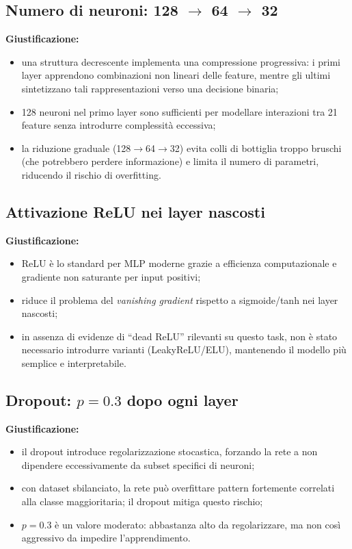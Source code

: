 \subsection{Numero di neuroni: 128 $\rightarrow$ 64 $\rightarrow$ 32}
\textbf{Giustificazione:}
\begin{itemize}
  \item una struttura decrescente implementa una compressione progressiva: i primi layer apprendono combinazioni non lineari delle feature, mentre gli ultimi sintetizzano tali rappresentazioni verso una decisione binaria;
  \item 128 neuroni nel primo layer sono sufficienti per modellare interazioni tra 21 feature senza introdurre complessità eccessiva;
  \item la riduzione graduale (128$\to$64$\to$32) evita colli di bottiglia troppo bruschi (che potrebbero perdere informazione) e limita il numero di parametri, riducendo il rischio di overfitting.
\end{itemize}

\subsection{Attivazione ReLU nei layer nascosti}
\textbf{Giustificazione:}
\begin{itemize}
  \item ReLU è lo standard per MLP moderne grazie a efficienza computazionale e gradiente non saturante per input positivi;
  \item riduce il problema del \emph{vanishing gradient} rispetto a sigmoide/tanh nei layer nascosti;
  \item in assenza di evidenze di ``dead ReLU'' rilevanti su questo task, non è stato necessario introdurre varianti (LeakyReLU/ELU), mantenendo il modello più semplice e interpretabile.
\end{itemize}

\subsection{Dropout: $p=0.3$ dopo ogni layer}
\textbf{Giustificazione:}
\begin{itemize}
  \item il dropout introduce regolarizzazione stocastica, forzando la rete a non dipendere eccessivamente da subset specifici di neuroni;
  \item con dataset sbilanciato, la rete può overfittare pattern fortemente correlati alla classe maggioritaria; il dropout mitiga questo rischio;
  \item $p=0.3$ è un valore moderato: abbastanza alto da regolarizzare, ma non così aggressivo da impedire l'apprendimento.
\end{itemize}

